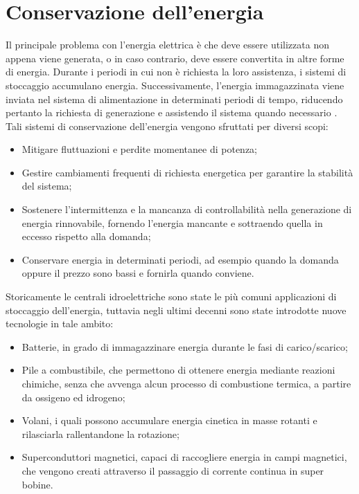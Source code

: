 \section{Conservazione dell'energia}
Il principale problema con l'energia elettrica è che deve essere utilizzata non appena viene generata, o in caso contrario, deve essere convertita in altre forme di energia. Durante i periodi in cui non è richiesta la loro assistenza, i sistemi di stoccaggio accumulano energia. Successivamente, l'energia immagazzinata viene inviata nel sistema di alimentazione in determinati periodi di tempo, riducendo pertanto la richiesta di generazione e assistendo il sistema quando necessario \cite{smartgrids}. 
Tali sistemi di conservazione dell'energia vengono sfruttati per diversi scopi:
\begin{itemize}
	\item Mitigare fluttuazioni e perdite momentanee di potenza;
	\item Gestire cambiamenti frequenti di richiesta energetica per garantire la stabilità del sistema; 
	\item Sostenere l'intermittenza e la mancanza di controllabilità nella generazione di energia rinnovabile, fornendo l'energia mancante e sottraendo quella in eccesso rispetto alla domanda;
	\item Conservare energia in determinati periodi, ad esempio quando la domanda oppure il prezzo sono bassi e fornirla quando conviene.
\end{itemize}

Storicamente le centrali idroelettriche sono state le più comuni applicazioni di stoccaggio dell'energia, tuttavia negli ultimi decenni sono state introdotte nuove tecnologie in tale ambito:
\begin{itemize}
	\item Batterie, in grado di immagazzinare energia durante le fasi di carico/scarico;
	\item Pile a combustibile, che permettono di ottenere energia mediante reazioni chimiche, senza che avvenga alcun processo di combustione termica, a partire da ossigeno ed idrogeno;
	\item Volani, i quali possono accumulare energia cinetica in masse rotanti e rilasciarla rallentandone la rotazione;
	\item Superconduttori magnetici, capaci di raccogliere energia in campi magnetici, che vengono creati attraverso il passaggio di corrente continua in super bobine.  
\end{itemize}

